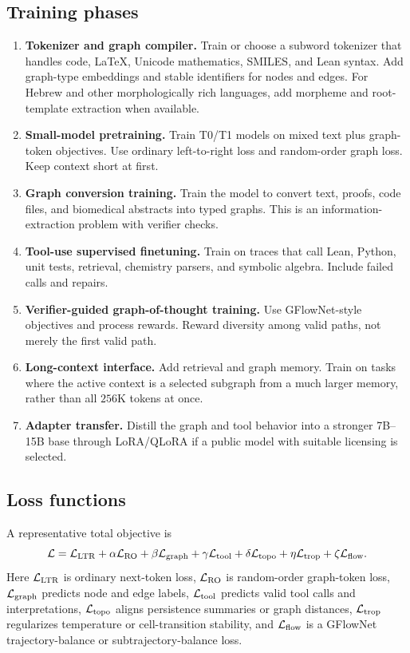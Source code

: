 \documentclass[11pt]{article}
\newcommand{\1}{\mathbf{1}}
\begin{document}
\subsection{Training phases}

\begin{enumerate}
\item \textbf{Tokenizer and graph compiler.} Train or choose a subword tokenizer that handles code, LaTeX, Unicode mathematics, SMILES, and Lean syntax. Add graph-type embeddings and stable identifiers for nodes and edges. For Hebrew and other morphologically rich languages, add morpheme and root-template extraction when available.
\item \textbf{Small-model pretraining.} Train T0/T1 models on mixed text plus graph-token objectives. Use ordinary left-to-right loss and random-order graph loss. Keep context short at first.
\item \textbf{Graph conversion training.} Train the model to convert text, proofs, code files, and biomedical abstracts into typed graphs. This is an information-extraction problem with verifier checks.
\item \textbf{Tool-use supervised finetuning.} Train on traces that call Lean, Python, unit tests, retrieval, chemistry parsers, and symbolic algebra. Include failed calls and repairs.
\item \textbf{Verifier-guided graph-of-thought training.} Use GFlowNet-style objectives and process rewards. Reward diversity among valid paths, not merely the first valid path.
\item \textbf{Long-context interface.} Add retrieval and graph memory. Train on tasks where the active context is a selected subgraph from a much larger memory, rather than all $256$K tokens at once.
\item \textbf{Adapter transfer.} Distill the graph and tool behavior into a stronger 7B--15B base through LoRA/QLoRA if a public model with suitable licensing is selected.
\end{enumerate}

\subsection{Loss functions}

A representative total objective is
\[
\mathcal{L}=\mathcal{L}_{\rm LTR}+\alpha\mathcal{L}_{\rm RO}+\beta\mathcal{L}_{\rm graph}+\gamma\mathcal{L}_{\rm tool}+\delta\mathcal{L}_{\rm topo}+\eta\mathcal{L}_{\rm trop}+\zeta\mathcal{L}_{\rm flow}.
\]
Here $\mathcal{L}_{\rm LTR}$ is ordinary next-token loss, $\mathcal{L}_{\rm RO}$ is random-order graph-token loss, $\mathcal{L}_{\rm graph}$ predicts node and edge labels, $\mathcal{L}_{\rm tool}$ predicts valid tool calls and interpretations, $\mathcal{L}_{\rm topo}$ aligns persistence summaries or graph distances, $\mathcal{L}_{\rm trop}$ regularizes temperature or cell-transition stability, and $\mathcal{L}_{\rm flow}$ is a GFlowNet trajectory-balance or subtrajectory-balance loss.
\end{document}
